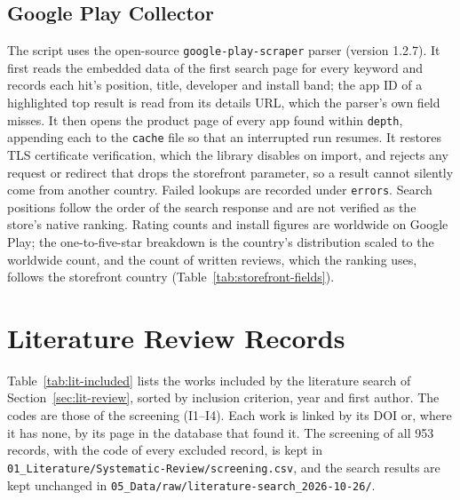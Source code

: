 \documentclass[twoside,its]{bossthesis}
\begin{document}


\section{Google Play Collector}
The script uses the open-source \texttt{google-play-scraper} parser (version
1.2.7). It first reads the embedded data of the first search page for every
keyword and records each hit's position, title, developer and install band; the
app ID of a highlighted top result is read from its details URL, which the
parser's own field misses. It then opens the product page of every app found
within \texttt{depth}, appending each to the \texttt{cache} file so that an
interrupted run resumes. It restores TLS certificate verification, which the
library disables on import, and rejects any request or redirect that drops the
storefront parameter, so a result cannot silently come from another country.
Failed lookups are recorded under \texttt{errors}. Search positions follow the
order of the search response and are not verified as the store's native
ranking. Rating counts and install figures are worldwide on Google Play; the
one-to-five-star breakdown is the country's distribution scaled to the
worldwide count, and the count of written reviews, which the ranking uses,
follows the storefront country (Table~\ref{tab:storefront-fields}).





\chapter{Literature Review Records}
\label{app:literature}
Table~\ref{tab:lit-included} lists the works included by the literature search
of Section~\ref{sec:lit-review}, sorted by inclusion criterion, year and first
author. The codes are those of the screening (I1--I4). Each work is linked by
its DOI or, where it has none, by its page in the database that found it. The
screening of all 953 records, with the code of every excluded record, is kept
in \texttt{01\_Literature/Systematic-Review/screening.csv}, and the search
results are kept unchanged in
\texttt{05\_Data/raw/literature-search\_2026-10-26/}.
\end{document}
